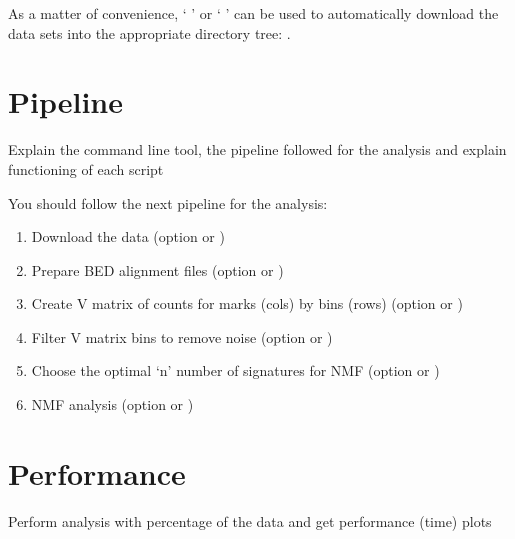 As a matter of convenience, ` ' or `   ' can be used to automatically download the data sets into the appropriate directory tree: .


\section{Pipeline}

Explain the command line tool, the pipeline followed for the analysis and explain functioning of each script

You should follow the next pipeline for the analysis:

\begin{enumerate}
    \item Download the data (option  or )
    \item Prepare BED alignment files (option  or )
    \item Create V matrix of counts for marks (cols) by bins (rows) (option  or )
    \item Filter V matrix bins to remove noise (option  or )
    \item Choose the optimal `n' number of signatures for NMF (option  or )
    \item NMF analysis (option  or )
\end{enumerate}

\section{Performance}

Perform analysis with percentage of the data and get performance (time) plots
